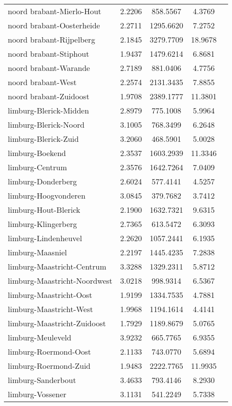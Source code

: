 \begin{longtable}{llccc}
noord brabant-Mierlo-Hout & 2.2206 & 858.5567 & 4.3769 \\
noord brabant-Oosterheide & 2.2711 & 1295.6620 & 7.2752 \\
noord brabant-Rijpelberg & 2.1845 & 3279.7709 & 18.9678 \\
noord brabant-Stiphout & 1.9437 & 1479.6214 & 6.8681 \\
noord brabant-Warande & 2.7189 & 881.0406 & 4.7756 \\
noord brabant-West & 2.2574 & 2131.3435 & 7.8855 \\
noord brabant-Zuidoost & 1.9708 & 2389.1777 & 11.3801 \\
limburg-Blerick-Midden & 2.8979 & 775.1008 & 5.9964 \\
limburg-Blerick-Noord & 3.1005 & 768.3499 & 6.2648 \\
limburg-Blerick-Zuid & 3.2060 & 468.5901 & 5.0028 \\
limburg-Boekend & 2.3537 & 1603.2939 & 11.3346 \\
limburg-Centrum & 2.3576 & 1642.7264 & 7.0409 \\
limburg-Donderberg & 2.6024 & 577.4141 & 4.5257 \\
limburg-Hoogvonderen & 3.0845 & 379.7682 & 3.7412 \\
limburg-Hout-Blerick & 2.1900 & 1632.7321 & 9.6315 \\
limburg-Klingerberg & 2.7365 & 613.5472 & 6.3093 \\
limburg-Lindenheuvel & 2.2620 & 1057.2441 & 6.1935 \\
limburg-Maasniel & 2.2197 & 1445.4235 & 7.2838 \\
limburg-Maastricht-Centrum & 3.3288 & 1329.2311 & 5.8712 \\
limburg-Maastricht-Noordwest & 3.0218 & 998.9314 & 6.5367 \\
limburg-Maastricht-Oost & 1.9199 & 1334.7535 & 4.7881 \\
limburg-Maastricht-West & 1.9968 & 1194.1614 & 4.4141 \\
limburg-Maastricht-Zuidoost & 1.7929 & 1189.8679 & 5.0765 \\
limburg-Meuleveld & 3.9232 & 665.7765 & 6.9355 \\
limburg-Roermond-Oost & 2.1133 & 743.0770 & 5.6894 \\
limburg-Roermond-Zuid & 1.9483 & 2222.7765 & 11.9935 \\
limburg-Sanderbout & 3.4633 & 793.4146 & 8.2930 \\
limburg-Vossener & 3.1131 & 541.2249 & 5.7338 \\

\end{longtable}

